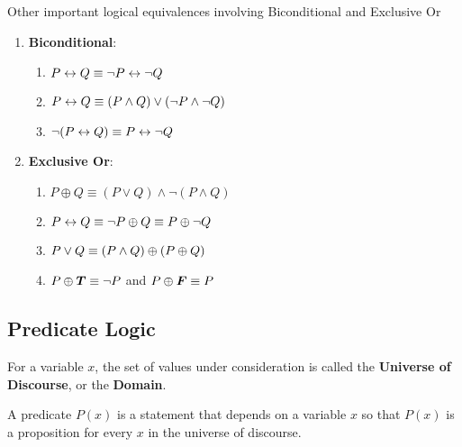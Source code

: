 \begin{remark}
    Other important logical equivalences involving Biconditional and Exclusive Or
    \begin{multicols}{2}
        \begin{enumerate}
            \item \textbf{Biconditional}:
            \begin{enumerate}
                \item $P \leftrightarrow Q \equiv \neg P \leftrightarrow \neg Q$
                \item $P \leftrightarrow Q \equiv (P \land Q) \lor (\neg P \land \neg Q)$
                \item $\neg (P \leftrightarrow Q) \equiv P \leftrightarrow \neg Q$
            \end{enumerate}
            \columnbreak
            \item \textbf{Exclusive Or}:
            \begin{enumerate}
                \item $P \oplus Q \equiv (P \lor Q) \land \neg (P \land Q)$
                \item $P \leftrightarrow Q \equiv \neg P \oplus Q \equiv P \oplus \neg Q$
                \item $P \lor Q \equiv (P \land Q) \oplus (P \oplus Q)$
                \item $P \oplus \boldsymbol{T} \equiv \neg P$ and $P \oplus \boldsymbol{F} \equiv P$
            \end{enumerate}
        \end{enumerate}
    \end{multicols}
\end{remark}

\subsection{Predicate Logic}

\begin{definition}
    For a variable $x$, the set of values under consideration is called the \textbf{Universe of Discourse},
    or the \textbf{Domain}.
\end{definition}

\begin{definition}[Predicate]
    A predicate $P(x)$ is a statement that depends on a variable $x$ so that $P(x)$ is a proposition
    for every $x$ in the universe of discourse.
\end{definition}

